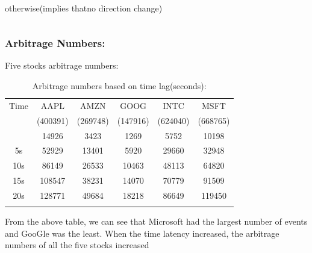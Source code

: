 \documentclass[xcolor={x11names,svgnames,dvipsnames}]{beamer}
\begin{document}
\begin{frame}
\begin{columns}
\begin{column}{.5\textwidth}
\begin{itemize}
			\\
			\subitem\textbullet  otherwise(implies that\alert{no direction} change)
			\end{itemize}
		\end{column}
	\end{columns}
\end{frame}



\begin{frame}
\frametitle{Arbitrage Numbers:}
\begin{block}{Five stocks arbitrage numbers:}
\begin{table}[h!]\small
  \caption{Arbitrage numbers based on time lag(seconds):}
\begin{center}
    \begin{tabular}{|c|c|c|c|c|c|}
    \hline
    Time&	AAPL &	AMZN&	GOOG&	INTC&	MSFT    \\
    &	(400391) &	(269748)&	(147916)&	(624040)&	(668765)  \\  
    \hline
    \small{
1s&	14926&	3423&	1269&	5752&	10198\\
5s&	52929&	13401&	5920&	29660&	32948\\
10s&	86149&	26533&	10463&	48113&	64820\\
15s&	108547&	38231&	14070&	70779&	91509\\
20s&	128771&	49684&	18218&	86649&	119450\\

}
\hline
\end{tabular}
\end{center}
\end{table}
\end{block}
From the above table, we can see that Microsoft had the largest number of events and GooGle was the least. When the time latency increased, the arbitrage numbers of all the five stocks increased 
\end{frame}
\end{document}
